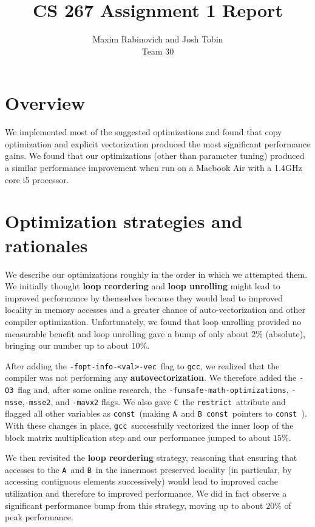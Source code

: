 \documentclass[12pt]{article}
\title{CS 267 Assignment 1 Report}
\author{Maxim Rabinovich and Josh Tobin \\ Team 30}
\newcommand{\gcc}{\texttt{gcc}}
\newcommand{\foptinfo}{\texttt{-fopt-info-<val>-vec}~}
\newcommand{\Othr}{\texttt{-O3}~}
\newcommand{\restrict}{\texttt{restrict}~}
\newcommand{\const}{\texttt{const}~}
\newcommand{\A}{\texttt{A}~}
\newcommand{\B}{\texttt{B}~}
\newcommand{\C}{\texttt{C}~}
\begin{document}
\maketitle

\section{Overview}

We implemented most of the suggested optimizations and found that copy optimization and explicit vectorization produced the most significant performance gains. We found that our optimizations (other than parameter tuning) produced a similar performance improvement when run on a Macbook Air with a 1.4GHz core i5 processor.

\section{Optimization strategies and rationales}

We describe our optimizations roughly in the order in which we attempted them. We initially thought {\bf loop reordering} and {\bf loop unrolling} might lead to
improved performance by themselves because they would lead to improved locality in memory accesses and a greater chance of auto-vectorization and other compiler optimization. Unfortunately, we found that loop unrolling provided no measurable benefit and loop unrolling gave a bump of only about $2\%$ (absolute),
bringing our number up to about $10\%$.

After adding the \foptinfo flag to \gcc, we realized that the compiler was not performing any {\bf autovectorization}. We therefore added the \Othr flag and, after
some online research, the \texttt{-funsafe-math-optimizations}, \texttt{-msse},\texttt{-msse2}, and \texttt{-mavx2} flags. We also gave \C the \restrict attribute and flagged all other variables
as \const (making \A and \B \const pointers to \const). With these changes in place, \gcc~successfully vectorized the inner loop of the block matrix multiplication step and our performance jumped to about $15\%$.

We then revisited the {\bf loop reordering} strategy, reasoning that ensuring that accesses to the \A and \B in the innermost preserved locality (in particular, by
accessing contiguous elements successively) would lead to improved cache utilization and therefore to improved performance. We did in fact observe a significant performance bump from this strategy, moving up to about $20\%$ of peak performance.
\end{document}
